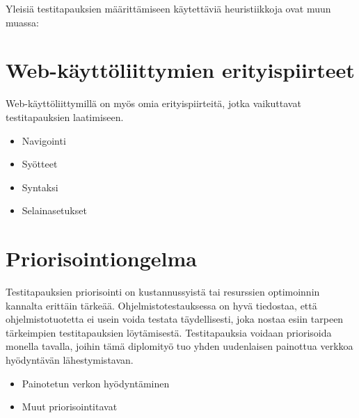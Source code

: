 Yleisiä testitapauksien määrittämiseen käytettäviä heuristiikkoja ovat muun muassa:

\section{Web-käyttöliittymien erityispiirteet}

Web-käyttöliittymillä on myös omia erityispiirteitä, jotka vaikuttavat testitapauksien laatimiseen.
\begin{itemize}
  \item Navigointi
  \item Syötteet
  \item Syntaksi
  \item Selainasetukset
\end{itemize}

\section{Priorisointiongelma}

Testitapauksien priorisointi on kustannussyistä tai resurssien optimoinnin kannalta erittäin tärkeää.
Ohjelmistotestauksessa on hyvä tiedostaa, että ohjelmistotuotetta ei usein voida testata täydellisesti, joka nostaa esiin tarpeen tärkeimpien testitapauksien löytämisestä.
Testitapauksia voidaan priorisoida monella tavalla, joihin tämä diplomityö tuo yhden uudenlaisen painottua verkkoa hyödyntävän lähestymistavan.
\begin{itemize}
  \item Painotetun verkon hyödyntäminen
  \item Muut priorisointitavat
\end{itemize}